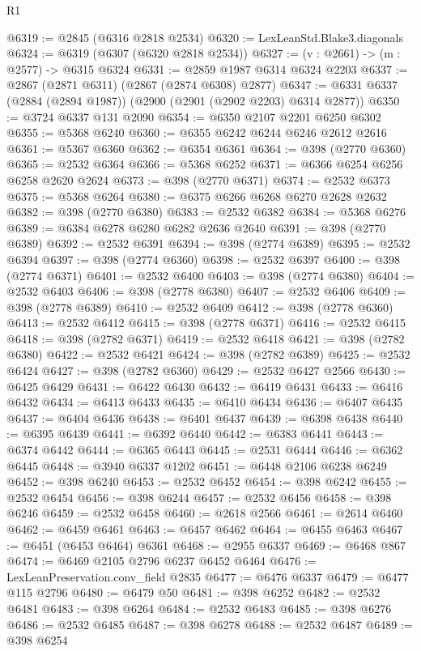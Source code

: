 \begin{lexlean}{R1}
\begin{coremodule}
@6319 := @2845 (@6316 @2818 @2534)
@6320 := LexLeanStd.Blake3.diagonals
@6324 := @6319 (@6307 (@6320 @2818 @2534))
@6327 := (v : @2661) -> (m : @2577) -> @6315 @6324
@6331 := @2859 @1987 @6314 @6324 @2203
@6337 := @2867 (@2871 @6311) (@2867 (@2874 @6308) @2877)
@6347 := @6331 @6337 (@2884 (@2894 @1987)) (@2900 (@2901 (@2902 @2203) @6314 @2877))
@6350 := @3724 @6337 @131 @2090
@6354 := @6350 @2107 @2201 @6250 @6302
@6355 := @5368 @6240
@6360 := @6355 @6242 @6244 @6246 @2612 @2616
@6361 := @5367 @6360
@6362 := @6354 @6361
@6364 := @398 (@2770 @6360)
@6365 := @2532 @6364
@6366 := @5368 @6252
@6371 := @6366 @6254 @6256 @6258 @2620 @2624
@6373 := @398 (@2770 @6371)
@6374 := @2532 @6373
@6375 := @5368 @6264
@6380 := @6375 @6266 @6268 @6270 @2628 @2632
@6382 := @398 (@2770 @6380)
@6383 := @2532 @6382
@6384 := @5368 @6276
@6389 := @6384 @6278 @6280 @6282 @2636 @2640
@6391 := @398 (@2770 @6389)
@6392 := @2532 @6391
@6394 := @398 (@2774 @6389)
@6395 := @2532 @6394
@6397 := @398 (@2774 @6360)
@6398 := @2532 @6397
@6400 := @398 (@2774 @6371)
@6401 := @2532 @6400
@6403 := @398 (@2774 @6380)
@6404 := @2532 @6403
@6406 := @398 (@2778 @6380)
@6407 := @2532 @6406
@6409 := @398 (@2778 @6389)
@6410 := @2532 @6409
@6412 := @398 (@2778 @6360)
@6413 := @2532 @6412
@6415 := @398 (@2778 @6371)
@6416 := @2532 @6415
@6418 := @398 (@2782 @6371)
@6419 := @2532 @6418
@6421 := @398 (@2782 @6380)
@6422 := @2532 @6421
@6424 := @398 (@2782 @6389)
@6425 := @2532 @6424
@6427 := @398 (@2782 @6360)
@6429 := @2532 @6427 @2566
@6430 := @6425 @6429
@6431 := @6422 @6430
@6432 := @6419 @6431
@6433 := @6416 @6432
@6434 := @6413 @6433
@6435 := @6410 @6434
@6436 := @6407 @6435
@6437 := @6404 @6436
@6438 := @6401 @6437
@6439 := @6398 @6438
@6440 := @6395 @6439
@6441 := @6392 @6440
@6442 := @6383 @6441
@6443 := @6374 @6442
@6444 := @6365 @6443
@6445 := @2531 @6444
@6446 := @6362 @6445
@6448 := @3940 @6337 @1202
@6451 := @6448 @2106 @6238 @6249
@6452 := @398 @6240
@6453 := @2532 @6452
@6454 := @398 @6242
@6455 := @2532 @6454
@6456 := @398 @6244
@6457 := @2532 @6456
@6458 := @398 @6246
@6459 := @2532 @6458
@6460 := @2618 @2566
@6461 := @2614 @6460
@6462 := @6459 @6461
@6463 := @6457 @6462
@6464 := @6455 @6463
@6467 := @6451 (@6453 @6464) @6361
@6468 := @2955 @6337
@6469 := @6468 @867
@6474 := @6469 @2105 @2796 @6237 @6452 @6464
@6476 := LexLeanPreservation.conv_field @2835
@6477 := @6476 @6337
@6479 := @6477 @115 @2796
@6480 := @6479 @50
@6481 := @398 @6252
@6482 := @2532 @6481
@6483 := @398 @6264
@6484 := @2532 @6483
@6485 := @398 @6276
@6486 := @2532 @6485
@6487 := @398 @6278
@6488 := @2532 @6487
@6489 := @398 @6254

\end{coremodule}
\end{lexlean}
